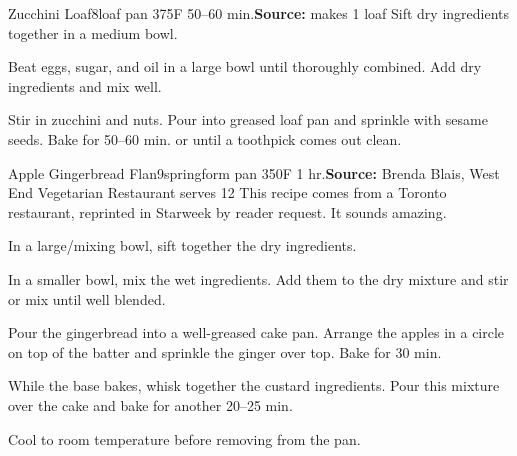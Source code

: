 \begin{recipe}{Zucchini Loaf}{8\inch{}\inch loaf pan \hfill 375\0F \hfill 50--60 min.}{\textbf{Source:} \hfill makes 1 loaf}
 Sift dry ingredients together in a medium bowl.

 Beat eggs, sugar, and oil in a large bowl until thoroughly combined. Add dry ingredients and mix well.

 Stir in zucchini and nuts. Pour into greased loaf pan and sprinkle with sesame seeds. Bake for 50--60 min. or until a toothpick comes out clean.
\end{recipe}

\begin{recipe}{Apple Gingerbread Flan}{9\inch springform pan \hfill 350\0F \hfill 1 hr.}{\textbf{Source:} Brenda Blais, West End Vegetarian Restaurant \hfill serves 12}
 \freeform [CB] This recipe comes from a Toronto restaurant, reprinted in Starweek by reader request. It sounds amazing.

 In a large/mixing bowl, sift together the dry ingredients.

 In a smaller bowl, mix the wet ingredients. Add them to the dry mixture and stir or mix until well blended.

 Pour the gingerbread into a well-greased cake pan. Arrange the apples in a circle on top of the batter and sprinkle the ginger over top. Bake for 30 min.

 While the base bakes, whisk together the custard ingredients. Pour this mixture over the cake and bake for another 20--25 min.

 \newstep Cool to room temperature before removing from the pan.
\end{recipe}
